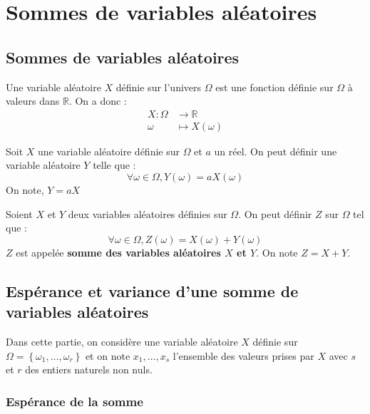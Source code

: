 \chapter{Sommes de variables aléatoires}
\section{Sommes de variables aléatoires}

\begin{definition}
    Une variable aléatoire \(X\) définie sur l'univers \(\Omega \) est une fonction définie sur \(\Omega \) à valeurs dans \(\mathbb{R}\). On a donc : \begin{align*}
        X: \Omega  &\longrightarrow \mathbb{R} \\
        \omega  &\longmapsto X(\omega )
    \end{align*}   
\end{definition}

\begin{definition}
    Soit \(X\) une variable aléatoire définie sur \(\Omega \) et \(a\) un réel. On peut définir une variable aléatoire \(Y\) telle que : 
    \[
        \forall \omega \in \Omega, Y(\omega) = a X(\omega)
    \] 
    On note, \(Y = aX\) 
\end{definition}

\begin{definition}
    Soient \(X\) et \(Y\) deux variables aléatoires définies sur \(\Omega \). On peut définir \(Z\) sur \(\Omega \) tel que : 
    \[
        \forall \omega  \in \Omega, Z(\omega ) = X(\omega ) + Y(\omega )
    \]  
    \(Z\) est appelée \textbf{somme des variables aléatoires \(X\) et \(Y\)}. On note \(Z = X+Y\).
\end{definition}

\section{Espérance et variance d'une somme de variables aléatoires}
Dans cette partie, on considère une variable aléatoire \(X\) définie sur \(\Omega  = \left\{  \omega_{1},\dots,\omega_{r}\right\}\) et on note \({x_{1},\dots,x_{s}}\) l'ensemble des valeurs prises par \(X\) avec \(s\) et \(r\) des entiers naturels non nuls.

\subsection{Espérance de la somme}

